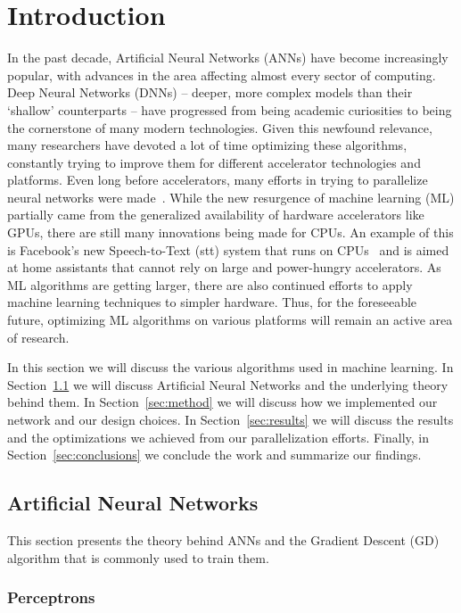 \section{Introduction} 
%
In the past decade, Artificial Neural Networks (ANNs) have become increasingly
popular, with advances in the area affecting almost every sector of computing.
Deep Neural Networks (DNNs) \--- deeper, more complex models than their
`shallow' counterparts \--- have progressed from being academic curiosities to
being the cornerstone of many modern technologies.  Given this newfound
relevance, many researchers have devoted a lot of time optimizing these
algorithms, constantly trying to improve them for different accelerator
technologies and platforms. Even long before accelerators, many efforts in
trying to parallelize neural networks were made~\cite{10.1007/BFb0024235}.
While the new resurgence of machine learning (ML) partially came from the
generalized availability of hardware accelerators like GPUs, there are still
many innovations being made for CPUs. An example of this is Facebook's new
Speech-to-Text (stt) system that runs on CPUs~\cite{fbcpu} and is aimed at home
assistants that cannot rely on large and power-hungry accelerators.  As ML
algorithms are getting larger, there are also continued efforts to apply machine
learning techniques to simpler hardware. Thus, for the foreseeable future,
optimizing ML algorithms on various platforms will remain an active area of
research.

In this section we will discuss the various algorithms used in machine learning.
In Section~\ref{sec:ann} we will discuss Artificial Neural Networks and the
underlying theory behind them. In Section~\ref{sec:method} we will discuss how
we implemented our network and our design choices. In Section~\ref{sec:results}
we will discuss the results and the optimizations we achieved from our
parallelization efforts. Finally, in Section~\ref{sec:conclusions} we conclude
the work and summarize our findings.

\subsection{Artificial Neural Networks}\label{sec:ann}

This section presents the theory behind ANNs and the Gradient Descent (GD)
algorithm that is commonly used to train them.

\subsubsection{Perceptrons}

